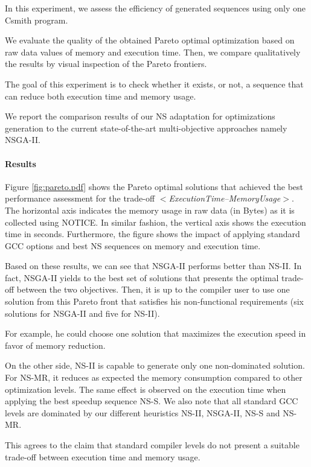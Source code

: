 In this experiment, we assess the efficiency of generated sequences using only one Csmith program.

We evaluate the quality of the obtained Pareto optimal optimization based on raw data values of memory and execution time. Then, we compare qualitatively the results by visual inspection of the Pareto frontiers.

The goal of this experiment is to check whether it exists, or not, a sequence that can reduce both execution time and memory usage.

We report the comparison results of our NS adaptation for optimizations generation to the current state-of-the-art multi-objective approaches namely NSGA-II. 

\paragraph{Results}

Figure \ref{fig:pareto.pdf} shows the Pareto optimal solutions that achieved the best performance assessment for the trade-off \textit{$<$ExecutionTime--MemoryUsage$>$}. 
The horizontal axis indicates the memory usage in raw data (in Bytes) as it is collected using NOTICE. In similar fashion, the vertical axis shows the execution time in seconds. Furthermore, the figure shows the impact of applying standard GCC options and best NS sequences on memory and execution time. 

Based on these results, we can see that NSGA-II performs better than NS-II. In fact, NSGA-II yields to the best set of solutions that presents the optimal trade-off between the two objectives. Then, it is up to the compiler user to use one solution from this Pareto front that satisfies his non-functional requirements (six solutions for NSGA-II and five for NS-II). 

For example, he could choose one solution that maximizes the execution speed in favor of memory reduction. 

On the other side, NS-II is capable to generate only one non-dominated solution. For NS-MR, it reduces as expected the memory consumption compared to other optimization levels. The same effect is observed on the execution time when applying the best speedup sequence NS-S. We also note that all standard GCC levels are dominated by our different heuristics NS-II, NSGA-II, NS-S and NS-MR.

This agrees to the claim that standard compiler levels do not present a suitable trade-off between execution time and memory usage.
	
